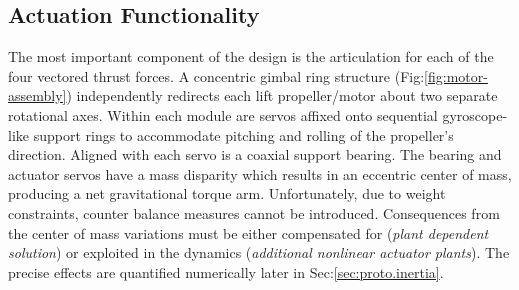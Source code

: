 \subsection{Actuation Functionality}
\label{subsec:proto.design.actuation}
The most important component of the design is the articulation for each of the four vectored thrust forces. A concentric gimbal ring structure (Fig:\ref{fig:motor-assembly}) independently redirects each lift propeller/motor about two separate rotational axes. Within each module are servos affixed onto sequential gyroscope-like support rings to accommodate pitching and rolling of the propeller's direction. Aligned with each servo is a coaxial support bearing. The bearing and actuator servos have a mass disparity which results in an eccentric center of mass, producing a net gravitational torque arm. Unfortunately, due to weight constraints, counter balance measures cannot be introduced. Consequences from the center of mass variations must be either compensated for (\emph{plant dependent solution}) or exploited in the dynamics (\emph{additional nonlinear actuator plants}). The precise effects are quantified numerically later in Sec:\ref{sec:proto.inertia}.
\par
